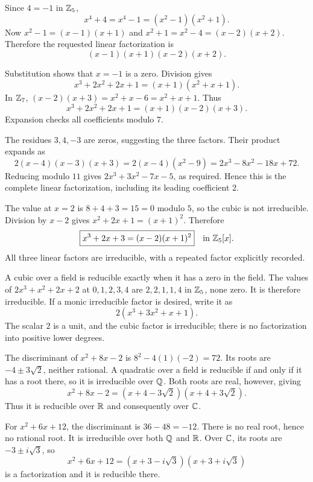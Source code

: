 Since $4=-1$ in $\mathbb{Z}_5$,
\[x^4+4=x^4-1=(x^2-1)(x^2+1).
\]
Now $x^2-1=(x-1)(x+1)$ and $x^2+1=x^2-4=(x-2)(x+2)$. Therefore the requested linear factorization is
\[\boxed{(x-1)(x+1)(x-2)(x+2)}.
\]

Substitution shows that $x=-1$ is a zero. Division gives
\[x^3+2x^2+2x+1=(x+1)(x^2+x+1).
\]
In $\mathbb{Z}_7$, $(x-2)(x+3)=x^2+x-6=x^2+x+1$. Thus
\[\boxed{x^3+2x^2+2x+1=(x+1)(x-2)(x+3)}.
\]
Expansion checks all coefficients modulo $7$.

The residues $3,4,-3$ are zeros, suggesting the three factors. Their product expands as
\[2(x-4)(x-3)(x+3)=2(x-4)(x^2-9)
=2x^3-8x^2-18x+72.
\]
Reducing modulo $11$ gives $2x^3+3x^2-7x-5$, as required. Hence this is the complete linear factorization, including its leading coefficient $2$.

The value at $x=2$ is $8+4+3=15=0$ modulo $5$, so the cubic is not irreducible. Division by $x-2$ gives $x^2+2x+1=(x+1)^2$. Therefore
\[\boxed{x^3+2x+3=(x-2)(x+1)^2}\quad\text{in }\mathbb{Z}_5[x].
\]
All three linear factors are irreducible, with a repeated factor explicitly recorded.

A cubic over a field is reducible exactly when it has a zero in the field. The values of $2x^3+x^2+2x+2$ at $0,1,2,3,4$ are $2,2,1,1,4$ in $\mathbb{Z}_5$, none zero. It is therefore irreducible. If a monic irreducible factor is desired, write it as
\[\boxed{2(x^3+3x^2+x+1)}.
\]
The scalar $2$ is a unit, and the cubic factor is irreducible; there is no factorization into positive lower degrees.

The discriminant of $x^2+8x-2$ is $8^2-4(1)(-2)=72$. Its roots are $-4\pm3\sqrt2$, neither rational. A quadratic over a field is reducible if and only if it has a root there, so it is irreducible over $\mathbb{Q}$. Both roots are real, however, giving
\[x^2+8x-2=(x+4-3\sqrt2)(x+4+3\sqrt2).
\]
Thus it is reducible over $\mathbb{R}$ and consequently over $\mathbb{C}$.

For $x^2+6x+12$, the discriminant is $36-48=-12$. There is no real root, hence no rational root. It is irreducible over both $\mathbb{Q}$ and $\mathbb{R}$. Over $\mathbb{C}$, its roots are $-3\pm i\sqrt3$, so
\[x^2+6x+12=(x+3-i\sqrt3)(x+3+i\sqrt3)
\]
is a factorization and it is reducible there.

